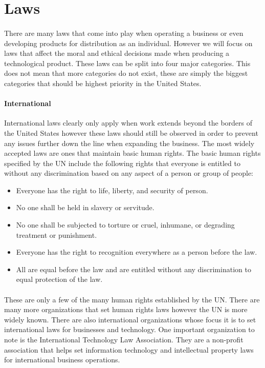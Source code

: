 \documentclass[notitlepage,a4paper,12pt]{article}
\begin{document}
\section*{Laws}
\paragraph{}There are many laws that come into play when operating a business or even developing products for distribution as an individual. However we will focus on laws that affect the moral and ethical decisions made when producing a technological product. These laws can be split into four major categories. This does not mean that more categories do not exist, these are simply the biggest categories that should be highest priority in the United States.
\paragraph{International}International laws clearly only apply when work extends beyond the borders of the United States however these laws should still be observed in order to prevent any issues further down the line when expanding the business. The most widely accepted laws are ones that maintain basic human rights. The basic human rights specified by the UN include the following rights that everyone is entitled to without any discrimination based on any aspect of a person or group of people:
	\begin{itemize}
	\item Everyone has the right to life, liberty, and security of person.
	\item No one shall be held in slavery or servitude.
	\item No one shall be subjected to torture or cruel, inhumane, or degrading treatment or punishment.
	\item Everyone has the right to recognition everywhere as a person before the law.
	\item All are equal before the law and are entitled without any discrimination to equal protection of the law.
	\end{itemize}
\paragraph{}These are only a few of the many human rights established by the UN. There are many more organizations that set human rights laws however the UN is more widely known. There are also international organizations whose focus it is to set international laws for businesses and technology. One important organization to note is the International Technology Law Association. They are a non-profit association that helps set information technology and intellectual property laws for international business operations.
\end{document}
